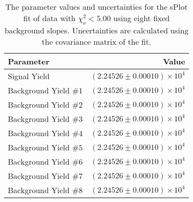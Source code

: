 
\begin{table}[ht]
    \begin{center}
        \begin{tabular}{lr}\toprule
            Parameter & Value \\\midrule
            Signal Yield & $(2.24526 \pm 0.00010) \times 10^{4}$ \\
            Background Yield $\#1$ & $(2.24526 \pm 0.00010) \times 10^{4}$ \\
            Background Yield $\#2$ & $(2.24526 \pm 0.00010) \times 10^{4}$ \\
            Background Yield $\#3$ & $(2.24526 \pm 0.00010) \times 10^{4}$ \\
            Background Yield $\#4$ & $(2.24526 \pm 0.00010) \times 10^{4}$ \\
            Background Yield $\#5$ & $(2.24526 \pm 0.00010) \times 10^{4}$ \\
            Background Yield $\#6$ & $(2.24526 \pm 0.00010) \times 10^{4}$ \\
            Background Yield $\#7$ & $(2.24526 \pm 0.00010) \times 10^{4}$ \\
            Background Yield $\#8$ & $(2.24526 \pm 0.00010) \times 10^{4}$ \\\bottomrule
        \end{tabular}
        \caption{The parameter values and uncertainties for the sPlot fit of data with $\chi^2_\nu < 5.00$ using eight fixed background slopes. Uncertainties are calculated using the covariance matrix of the fit.}\label{tab:splot-fit-results-chisqdof-5.00-fixed-8}
    \end{center}
\end{table}
